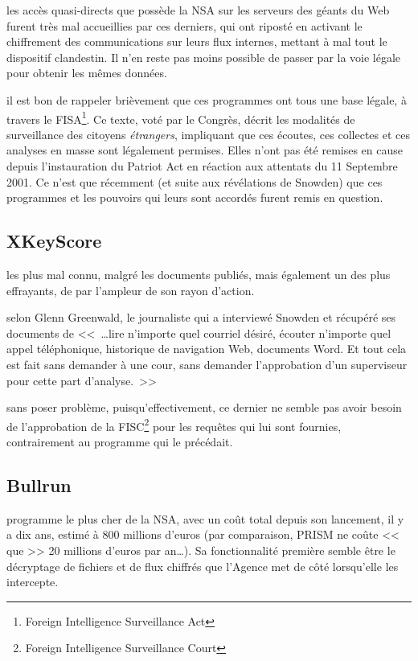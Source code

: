  les accès quasi-directs que possède la NSA sur
les serveurs des géants du Web furent très mal accueillies par ces derniers, qui
ont riposté en activant le chiffrement des communications sur leurs flux
internes\autocite{WPGoogle}, mettant à mal tout le dispositif clandestin. Il n'en
reste pas moins possible de passer par la voie légale pour obtenir les mêmes
données.

 il est bon de rappeler brièvement que ces programmes ont
tous une base légale, à travers le FISA\footnote{Foreign Intelligence
Surveillance Act}. Ce texte, voté par le Congrès, décrit les modalités de
surveillance des citoyens \emph{étrangers}, impliquant que ces écoutes, ces
collectes et ces analyses en masse sont légalement permises. Elles n'ont pas
été remises en cause depuis l'instauration du Patriot Act en réaction aux attentats du 11 Septembre 2001.
Ce n'est que récemment (et suite aux révélations de Snowden) que ces programmes
et les pouvoirs qui leurs sont accordés furent remis en question.

\subsection{XKeyScore}
 les plus mal connu, malgré les
documents publiés, mais également un des plus effrayants, de par l'ampleur de
son rayon d'action. 

 selon Glenn Greenwald, le journaliste qui a
interviewé Snowden et récupéré ses documents de <<~\ldots lire n'importe quel
courriel désiré, écouter n'importe quel appel téléphonique, historique de
navigation Web, documents Word. Et tout cela est fait sans demander à une cour,
sans demander l'approbation d'un superviseur pour cette part
d'analyse.~>>\autocite{GGW}

 sans poser problème, puisqu'effectivement, ce dernier
ne semble pas avoir besoin de l'approbation de la FISC\footnote{Foreign
Intelligence Surveillance Court} pour les requêtes qui lui sont
fournies\autocite{Kimery}, contrairement au programme qui le précédait.

\subsection{Bullrun}

 programme le plus cher de la NSA, avec un
coût total depuis son lancement, il y a dix ans, estimé à 800 millions
d'euros\autocite{bullrun} (par comparaison, PRISM ne coûte << que >> 20 millions
d'euros par an\ldots).
Sa fonctionnalité première semble être le décryptage de fichiers et de flux
chiffrés que l'Agence met de côté lorsqu'elle les intercepte. 

